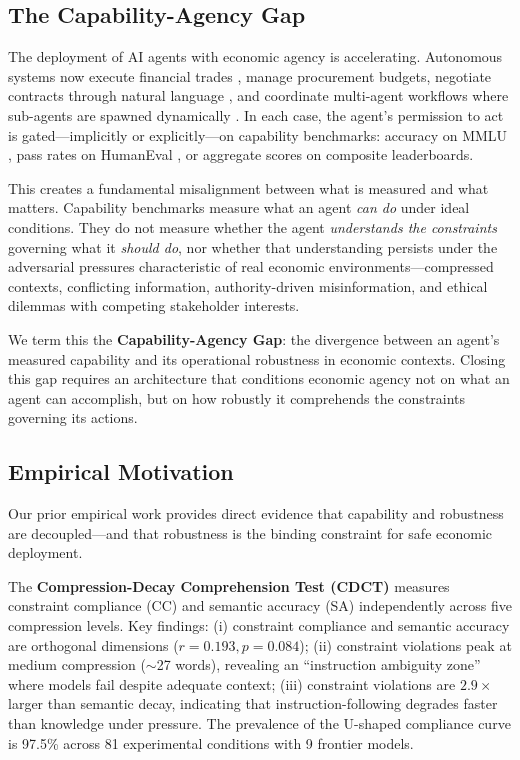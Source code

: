 \documentclass[11pt,a4paper]{article}
\begin{document}
\subsection{The Capability-Agency Gap}

The deployment of AI agents with economic agency is accelerating. Autonomous systems now execute financial trades \citep{chen2024autotrading}, manage procurement budgets, negotiate contracts through natural language \citep{lewis2017deal}, and coordinate multi-agent workflows where sub-agents are spawned dynamically \citep{wu2023autogen}. In each case, the agent's permission to act is gated---implicitly or explicitly---on capability benchmarks: accuracy on MMLU \citep{hendrycks2020measuring}, pass rates on HumanEval \citep{chen2021evaluating}, or aggregate scores on composite leaderboards.

This creates a fundamental misalignment between what is measured and what matters. Capability benchmarks measure what an agent \emph{can do} under ideal conditions. They do not measure whether the agent \emph{understands the constraints} governing what it \emph{should do}, nor whether that understanding persists under the adversarial pressures characteristic of real economic environments---compressed contexts, conflicting information, authority-driven misinformation, and ethical dilemmas with competing stakeholder interests.

We term this the \textbf{Capability-Agency Gap}: the divergence between an agent's measured capability and its operational robustness in economic contexts. Closing this gap requires an architecture that conditions economic agency not on what an agent can accomplish, but on how robustly it comprehends the constraints governing its actions.

\subsection{Empirical Motivation}

Our prior empirical work provides direct evidence that capability and robustness are decoupled---and that robustness is the binding constraint for safe economic deployment.

The \textbf{Compression-Decay Comprehension Test (CDCT)} \citep{baxi2025cdct} measures constraint compliance (CC) and semantic accuracy (SA) independently across five compression levels. Key findings: (i) constraint compliance and semantic accuracy are orthogonal dimensions ($r = 0.193, p = 0.084$); (ii) constraint violations peak at medium compression ($\sim$27 words), revealing an ``instruction ambiguity zone'' where models fail despite adequate context; (iii) constraint violations are $2.9\times$ larger than semantic decay, indicating that instruction-following degrades faster than knowledge under pressure. The prevalence of the U-shaped compliance curve is 97.5\% across 81 experimental conditions with 9 frontier models.
\end{document}
